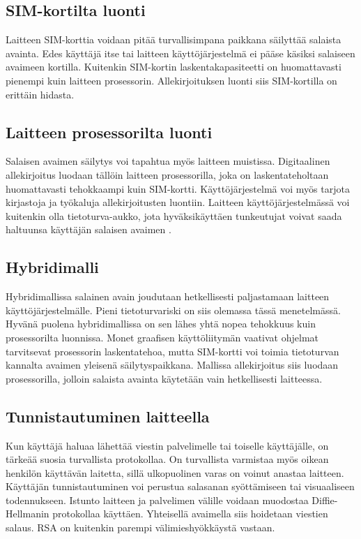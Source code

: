 \documentclass[finnish]{tktltiki2}
\theoremstyle{definition}
\theoremstyle{remark}
\begin{document}
\subsection{SIM-kortilta luonti}

Laitteen SIM-korttia voidaan pitää turvallisimpana paikkana säilyttää salaista avainta. Edes käyttäjä itse tai laitteen käyttöjärjestelmä ei pääse käsiksi salaiseen avaimeen kortilla. Kuitenkin SIM-kortin laskentakapasiteetti on huomattavasti pienempi kuin laitteen prosessorin. Allekirjoituksen luonti siis SIM-kortilla on erittäin hidasta. \cite{proxy}  

\subsection{Laitteen prosessorilta luonti}

Salaisen avaimen säilytys voi tapahtua myös laitteen muistissa. Digitaalinen allekirjoitus luodaan tällöin laitteen prosessorilla, joka on laskentateholtaan huomattavasti tehokkaampi kuin SIM-kortti. Käyttöjärjestelmä voi myös tarjota kirjastoja ja työkaluja allekirjoitusten luontiin. Laitteen käyttöjärjestelmässä voi kuitenkin olla tietoturva-aukko, jota hyväksikäyttäen tunkeutujat voivat saada haltuunsa käyttäjän salaisen avaimen . \cite{proxy}

\subsection{Hybridimalli}

Hybridimallissa salainen avain joudutaan hetkellisesti paljastamaan laitteen käyttöjärjestelmälle. Pieni tietoturvariski on siis olemassa tässä menetelmässä. Hyvänä puolena hybridimallissa on sen lähes yhtä nopea tehokkuus kuin prosessorilta luonnissa. Monet graafisen käyttöliitymän vaativat ohjelmat tarvitsevat prosessorin laskentatehoa, mutta SIM-kortti voi toimia tietoturvan kannalta avaimen yleisenä säilytyspaikkana. Mallissa allekirjoitus siis luodaan prosessorilla, jolloin salaista avainta käytetään vain hetkellisesti laitteessa. \cite{proxy}



\subsection{Tunnistautuminen laitteella}
Kun käyttäjä haluaa lähettää viestin palvelimelle tai toiselle käyttäjälle, on tärkeää suosia turvallista protokollaa. On turvallista varmistaa myös oikean henkilön käyttävän laitetta, sillä ulkopuolinen varas on voinut anastaa laitteen. Käyttäjän tunnistautuminen voi perustua salasanan syöttämiseen tai visuaaliseen todennukseen. Istunto laitteen ja palvelimen välille voidaan muodostaa Diffie-Hellmanin protokollaa käyttäen. Yhteisellä avaimella siis hoidetaan viestien salaus. RSA on kuitenkin parempi välimieshyökkäystä vastaan. \cite{enti}
\end{document}
